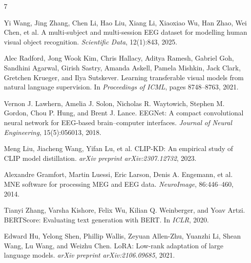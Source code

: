 \documentclass{article}
\begin{document}
\begin{thebibliography}{7}

Yi Wang, Jing Zhang, Chen Li, Hao Liu, Xiang Li, Xiaoxiao Wu, Han Zhao, Wei Chen, et al.
A multi-subject and multi-session EEG dataset for modelling human visual object recognition.
\textit{Scientific Data}, 12(1):843, 2025.

Alec Radford, Jong Wook Kim, Chris Hallacy, Aditya Ramesh, Gabriel Goh, Sandhini Agarwal, Girish Sastry, Amanda Askell, Pamela Mishkin, Jack Clark, Gretchen Krueger, and Ilya Sutskever.
Learning transferable visual models from natural language supervision.
In \textit{Proceedings of ICML}, pages 8748--8763, 2021.

Vernon J. Lawhern, Amelia J. Solon, Nicholas R. Waytowich, Stephen M. Gordon, Chou P. Hung, and Brent J. Lance.
EEGNet: A compact convolutional neural network for EEG-based brain--computer interfaces.
\textit{Journal of Neural Engineering}, 15(5):056013, 2018.

Meng Liu, Jiacheng Wang, Yifan Lu, et al.
CLIP-KD: An empirical study of CLIP model distillation.
\textit{arXiv preprint arXiv:2307.12732}, 2023.

Alexandre Gramfort, Martin Luessi, Eric Larson, Denis A. Engemann, et al.
MNE software for processing MEG and EEG data.
\textit{NeuroImage}, 86:446--460, 2014.

Tianyi Zhang, Varsha Kishore, Felix Wu, Kilian Q. Weinberger, and Yoav Artzi.
BERTScore: Evaluating text generation with BERT.
In \textit{ICLR}, 2020.

Edward Hu, Yelong Shen, Phillip Wallis, Zeyuan Allen-Zhu, Yuanzhi Li, Shean Wang, Lu Wang, and Weizhu Chen.
LoRA: Low-rank adaptation of large language models.
\textit{arXiv preprint arXiv:2106.09685}, 2021.

\end{thebibliography}
\end{document}
